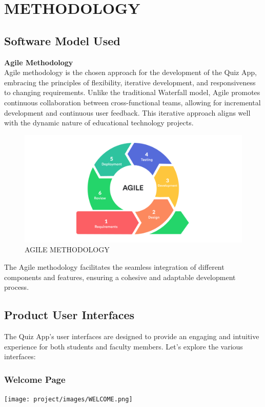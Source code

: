 \chapter{METHODOLOGY}
\section{Software Model Used}
\textbf{Agile Methodology}\\
Agile methodology is the chosen approach for the development of the Quiz App, embracing the principles of flexibility, iterative development, and responsiveness to changing requirements. Unlike the traditional Waterfall model, Agile promotes continuous collaboration between cross-functional teams, allowing for incremental development and continuous user feedback. This iterative approach aligns well with the dynamic nature of educational technology projects.

\begin{figure}[h!]
    \centering
    \includegraphics[scale=0.5]{project/images/Agile1.png}
    \caption{AGILE METHODOLOGY}
\end{figure}

The Agile methodology facilitates the seamless integration of different components and features, ensuring a cohesive and adaptable development process.

\section{Product User Interfaces}
The Quiz App's user interfaces are designed to provide an engaging and intuitive experience for both students and faculty members. Let's explore the various interfaces:

\subsection{Welcome Page}
\begin{center}
    \texttt{[image: project/images/WELCOME.png]}
\end{center}


